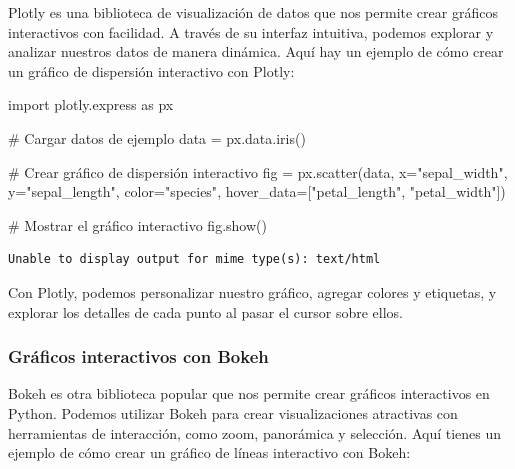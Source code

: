 \documentclass[
  a4paper,
]{article}
\newenvironment{Shaded}{}{}
\newcommand{\CommentTok}[1]{\textcolor[rgb]{0.42,0.45,0.49}{#1}}
\newcommand{\ImportTok}[1]{\textcolor[rgb]{0.01,0.18,0.38}{#1}}
\newcommand{\NormalTok}[1]{\textcolor[rgb]{0.14,0.16,0.18}{#1}}
\newcommand{\OperatorTok}[1]{\textcolor[rgb]{0.14,0.16,0.18}{#1}}
\newcommand{\StringTok}[1]{\textcolor[rgb]{0.01,0.18,0.38}{#1}}
\begin{document}
Plotly es una biblioteca de visualización de datos que nos permite crear
gráficos interactivos con facilidad. A través de su interfaz intuitiva,
podemos explorar y analizar nuestros datos de manera dinámica. Aquí hay
un ejemplo de cómo crear un gráfico de dispersión interactivo con
Plotly:

\begin{Shaded}
\begin{Highlighting}[]
\ImportTok{import}\NormalTok{ plotly.express }\ImportTok{as}\NormalTok{ px}

\CommentTok{\# Cargar datos de ejemplo}
\NormalTok{data }\OperatorTok{=}\NormalTok{ px.data.iris()}

\CommentTok{\# Crear gráfico de dispersión interactivo}
\NormalTok{fig }\OperatorTok{=}\NormalTok{ px.scatter(data, x}\OperatorTok{=}\StringTok{"sepal\_width"}\NormalTok{, y}\OperatorTok{=}\StringTok{"sepal\_length"}\NormalTok{, color}\OperatorTok{=}\StringTok{"species"}\NormalTok{, hover\_data}\OperatorTok{=}\NormalTok{[}\StringTok{"petal\_length"}\NormalTok{, }\StringTok{"petal\_width"}\NormalTok{])}

\CommentTok{\# Mostrar el gráfico interactivo}
\NormalTok{fig.show()}
\end{Highlighting}
\end{Shaded}

\begin{verbatim}
Unable to display output for mime type(s): text/html
\end{verbatim}

Con Plotly, podemos personalizar nuestro gráfico, agregar colores y
etiquetas, y explorar los detalles de cada punto al pasar el cursor
sobre ellos.

\hypertarget{gruxe1ficos-interactivos-con-bokeh}{%
\subsubsection{Gráficos interactivos con
Bokeh}\label{gruxe1ficos-interactivos-con-bokeh}}

Bokeh es otra biblioteca popular que nos permite crear gráficos
interactivos en Python. Podemos utilizar Bokeh para crear
visualizaciones atractivas con herramientas de interacción, como zoom,
panorámica y selección. Aquí tienes un ejemplo de cómo crear un gráfico
de líneas interactivo con Bokeh:
\end{document}
